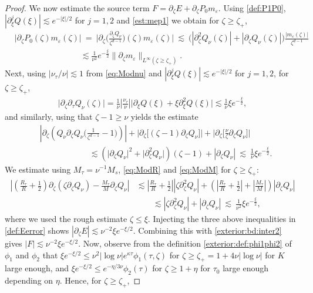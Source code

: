 \documentclass[11pt]{aims}
\theoremstyle{definition}
\newcommand{\ep}{\varepsilon}
\newcommand{\pa}{\partial}
\numberwithin{equation}{section}
\begin{document}
\begin{proof}
We now estimate the source term $F= \pa_\zeta E +\pa_\zeta P_0 m_\ep$. Using \eqref{def:P1P0}, $|\pa_\xi^j Q(\xi)|\lesssim e^{-|\xi|/2}$ for $j=1,2$ and \eqref{est:mep1} we obtain for $\zeta  \geq \zeta_+ $,
\begin{align}
\nonumber & \big|\pa_\zeta P_0(\zeta) m_\ep(\zeta)\big| \ = \ \big|\pa_\zeta \big(\frac{\pa_\zeta Q_\nu}{\zeta^{d-1}} \big)(\zeta ) m_\ep(\zeta)\big|  \ \lesssim  \ \Big(|\pa_\zeta^2 Q_\nu(\zeta)| + |\pa_\zeta Q_\nu(\zeta)|\Big) \frac{|m_\ep(\zeta)|}{\zeta^{d-1}}\\
\label{exterior:bd:inter2} &\qquad \qquad \qquad \qquad  \lesssim \frac{1}{\nu^2} e^{-\frac{\xi}{2}}  \| \pa_\zeta m_\ep\|_{L^\infty(\zeta \geq \zeta_+)}.
\end{align}
Next, using $|\nu_\tau/\nu |\lesssim 1$ from \eqref{eq:Modnu} and $|\pa_\xi^j Q(\xi)|\lesssim e^{-|\xi|/2}$ for $j=1,2$, for $\zeta \geq \zeta_+$,
\begin{align*}
\big| \pa_\zeta \pa_\tau  Q_\nu (\zeta)\big| =\frac{1}{\nu}|\frac{\nu_\tau}{\nu}| \big| \pa_\xi Q(\xi) +\xi \pa_\xi^2 Q(\xi)\big|   \lesssim  \frac{1}{\nu} \xi e^{-\frac{\xi}{2}},
\end{align*}
and similarly, using that $\zeta-1\geq \nu $ yields the estimate
\begin{align*}
& \left| \pa_\zeta \left(  Q_\nu \pa_\zeta  Q_\nu \Big(\frac{1}{\zeta^{d-1}} - 1 \Big)  \right) \right| + \Big| \pa_\zeta \big[(\zeta  -1) \pa_\zeta Q_\nu\big] \Big| + \Big| \pa_\zeta \big[ \frac{\nu}{\zeta} \pa_\zeta  Q_\nu\big] \Big|\\
&\qquad \qquad \qquad \lesssim \left(\big| \pa_\zeta  Q_\nu \big|^2 + \big| \pa_\zeta^2  Q_\nu\big|\right) (\zeta -1) + |\pa_\zeta  Q_\nu| \ \lesssim \ \frac{1}{\nu}\xi e^{-\frac{\xi}{2}}.
\end{align*} 
We estimate using $M_\tau=\nu^{-1}M_s$, \eqref{eq:ModR} and \eqref{eq:ModM} for $\zeta \geq \zeta_+$:
\begin{align*}
\left|\left(\frac{R_\tau}{R} + \frac{1}{2} \right) \pa_\zeta (\zeta \pa_\zeta  Q_\nu) - \frac{M_\tau}{M}\pa_\zeta  Q_\nu \right| & \lesssim  \left|\frac{R_\tau}{R} + \frac{1}{2} \right| |\zeta \pa_\zeta^2  Q_\nu| + \left( \left|\frac{R_\tau}{R} + \frac{1}{2} \right| + \left| \frac{M_\tau}{M} \right| \right) |\pa_\zeta  Q_\nu|\\
&\qquad \lesssim  |\zeta \pa_\zeta^2  Q_\nu| + |\pa_\zeta  Q_\nu|  \ \lesssim  \ \frac{1}{\nu^2} \xi e^{-\frac \xi 2},
\end{align*}
where we used the rough estimate $\zeta\leq \xi$. Injecting the three above inequalities in \eqref{def:Eerror} shows $|\pa_\zeta E|\lesssim \nu^{-2}\xi e^{-\xi/2}$. Combining this with \eqref{exterior:bd:inter2} gives $|F|\lesssim  \nu^{-2}\xi e^{-\xi/2}$. Now, observe from the definition \eqref{exterior:def:phi1phi2} of $\phi_1$ and $\phi_2$ that $\xi e^{-\xi/2}\leq \nu^2|\log \nu| e^{\kappa \tau}\phi_1(\tau,\zeta)$ for $\zeta \geq \zeta_+=1+4\nu |\log \nu|$ for $K$ large enough, and $\xi e^{-\xi/2}\leq e^{-\eta/3\nu}\phi_2(\tau)$ for $\zeta \geq 1+\eta$ for $\tau_0$ large enough depending on $\eta$. Hence, for $ \zeta\geq \zeta_+$,

\end{proof}
\end{document}
